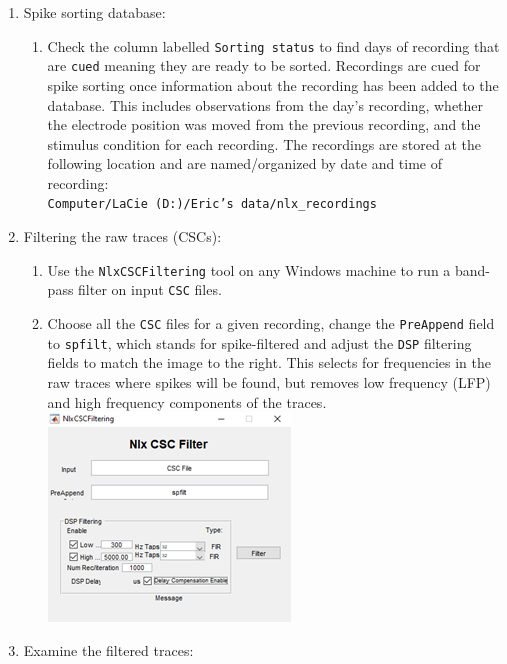 \documentclass[
]{book}
\providecommand{\tightlist}{%
  \setlength{\itemsep}{0pt}\setlength{\parskip}{0pt}}
\begin{document}
\begin{enumerate}
\def\labelenumi{\arabic{enumi}.}
\tightlist
\item
  Spike sorting database:

  \begin{enumerate}
  \def\labelenumii{\arabic{enumii}.}
  \tightlist
  \item
    Check the column labelled \texttt{Sorting\ status} to find days of
    recording that are \texttt{cued} meaning they are ready to be sorted.
    Recordings are cued for spike sorting once information about
    the recording has been added to the database. This includes
    observations from the day's recording, whether the electrode
    position was moved from the previous recording, and the
    stimulus condition for each recording. The recordings are
    stored at the following location and are named/organized by
    date and time of recording:\\
    \texttt{Computer/LaCie\ (D:)/Eric’s\ data/nlx\_recordings}
  \end{enumerate}
\item
  Filtering the raw traces (CSCs):

  \begin{enumerate}
  \def\labelenumii{\arabic{enumii}.}
  \tightlist
  \item
    Use the \texttt{NlxCSCFiltering} tool on any Windows machine to run a
    band-pass filter on input \texttt{CSC} files.
  \item
    Choose all the \texttt{CSC} files for a given recording, change the
    \texttt{PreAppend} field to \texttt{spfilt}, which stands for spike-filtered
    and adjust the \texttt{DSP} filtering fields to match the image to
    the right. This selects for frequencies in the raw traces
    where spikes will be found, but removes low frequency (LFP)
    and high frequency components of the traces.
    \includegraphics{source_images/sec3.2.1_nix_csc_filter.png}
  \end{enumerate}
\item
  Examine the filtered traces:


\end{enumerate}
\end{document}

